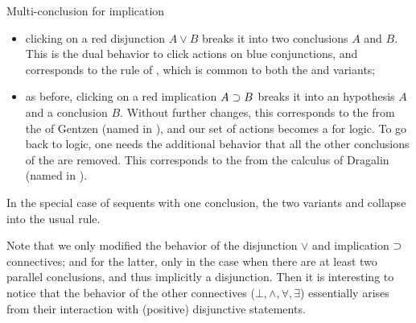 \begin{marginfigure}
  \caption{Multi-conclusion  for implication}
\end{marginfigure}

\begin{itemize}
  \item clicking on a red disjunction $A \lor B$ breaks it into two conclusions
  $A$ and $B$. This is the dual behavior to click actions on blue conjunctions,
  and corresponds to the {} rule of , which is
  common to both the  and  variants;
  \item as before, clicking on a red implication $A \supset B$ breaks it into an
  hypothesis $A$ and a conclusion $B$. Without further changes, this corresponds
  to the  from the    of Gentzen (named {} in
  ), and our set of actions becomes a 
  for  logic. To go back to  logic, one needs
  the additional behavior that all the other conclusions of the  are
  removed. This corresponds to the  from the
   calculus of Dragalin (named {} in
  ).
\end{itemize}

\begin{remark}
  In the special case of  sequents with one conclusion, the two
  variants {} and {} collapse into the usual
  {} rule.
\end{remark}
Note that we only modified the behavior of the disjunction $\lor$ and
implication $\supset$ connectives; and for the latter, only in the case when there
are at least two parallel conclusions, and thus implicitly a disjunction. Then
it is interesting to notice that the  behavior of the other connectives
($\bot, \land, \forall, \exists$) essentially arises from their interaction with
(positive) disjunctive statements.

